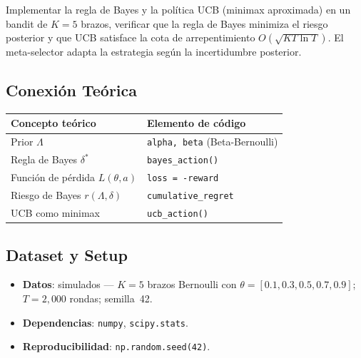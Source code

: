 Implementar la regla de Bayes y la política UCB (minimax aproximada) en un
bandit de $K=5$ brazos, verificar que la regla de Bayes minimiza el riesgo
posterior y que UCB satisface la cota de arrepentimiento $O(\sqrt{KT\ln T})$.
El meta-selector adapta la estrategia según la incertidumbre posterior.

\subsection*{Conexión Teórica}

\begin{center}
\small
\begin{tabular}{ll}
\toprule
\textbf{Concepto teórico} & \textbf{Elemento de código} \\
\midrule
Prior $\Lambda$ & \texttt{alpha, beta} (Beta-Bernoulli) \\
Regla de Bayes $\delta^*$ & \texttt{bayes\_action()} \\
Función de pérdida $L(\theta,a)$ & \texttt{loss = -reward} \\
Riesgo de Bayes $r(\Lambda,\delta)$ & \texttt{cumulative\_regret} \\
UCB como minimax & \texttt{ucb\_action()} \\
\bottomrule
\end{tabular}
\end{center}

\subsection*{Dataset y Setup}

\begin{itemize}
  \item \textbf{Datos}: simulados --- $K=5$ brazos Bernoulli con
    $\theta = [0.1, 0.3, 0.5, 0.7, 0.9]$; $T=2{,}000$ rondas; semilla~42.
  \item \textbf{Dependencias}: \texttt{numpy}, \texttt{scipy.stats}.
  \item \textbf{Reproducibilidad}: \texttt{np.random.seed(42)}.
\end{itemize}

